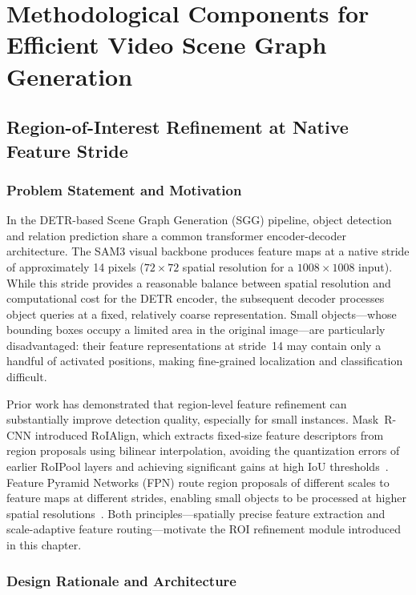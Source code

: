 \chapter{Methodological Components for Efficient Video Scene Graph Generation}

\section{Region-of-Interest Refinement at Native Feature Stride}

\subsection{Problem Statement and Motivation}

In the DETR-based Scene Graph Generation (SGG) pipeline, object detection and relation prediction share a common transformer encoder-decoder architecture. The SAM3 visual backbone produces feature maps at a native stride of approximately 14 pixels ($72 \times 72$ spatial resolution for a $1008 \times 1008$ input). While this stride provides a reasonable balance between spatial resolution and computational cost for the DETR encoder, the subsequent decoder processes object queries at a fixed, relatively coarse representation. Small objects—whose bounding boxes occupy a limited area in the original image—are particularly disadvantaged: their feature representations at stride~14 may contain only a handful of activated positions, making fine-grained localization and classification difficult.

Prior work has demonstrated that region-level feature refinement can substantially improve detection quality, especially for small instances. Mask~R-CNN introduced RoIAlign, which extracts fixed-size feature descriptors from region proposals using bilinear interpolation, avoiding the quantization errors of earlier RoIPool layers and achieving significant gains at high IoU thresholds~\cite{he2017mask}. Feature Pyramid Networks (FPN) route region proposals of different scales to feature maps at different strides, enabling small objects to be processed at higher spatial resolutions~\cite{lin2017feature}. Both principles—spatially precise feature extraction and scale-adaptive feature routing—motivate the ROI refinement module introduced in this chapter.

\subsection{Design Rationale and Architecture}

